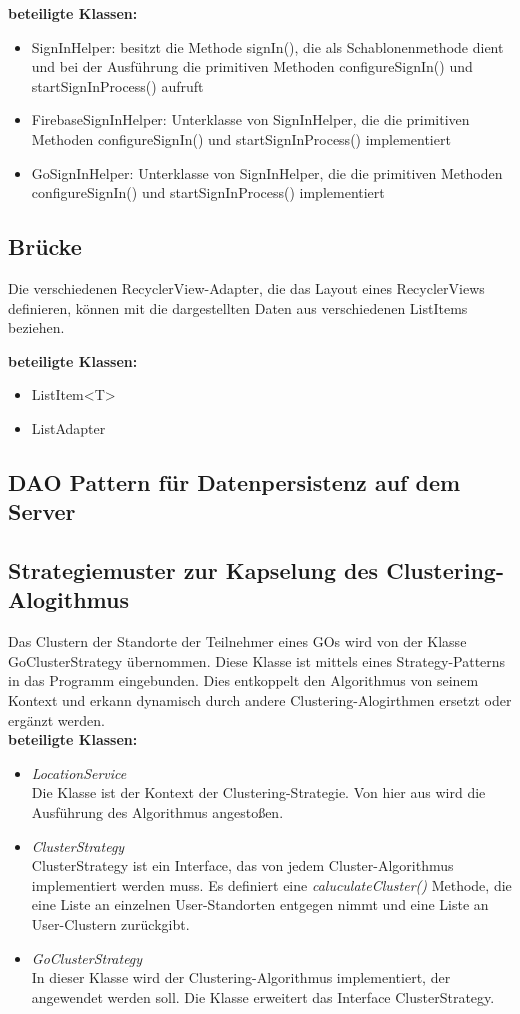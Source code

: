 \textbf{beteiligte Klassen:}
\begin{itemize}
	\item SignInHelper: besitzt die Methode signIn(), die als Schablonenmethode dient und bei der Ausführung die primitiven Methoden configureSignIn() und startSignInProcess() aufruft
	\item FirebaseSignInHelper: Unterklasse von SignInHelper, die die primitiven Methoden configureSignIn() und startSignInProcess() implementiert
	\item GoSignInHelper: Unterklasse von SignInHelper, die die primitiven Methoden configureSignIn() und startSignInProcess() implementiert
\end{itemize}

\subsection{Brücke}
Die verschiedenen RecyclerView-Adapter, die das Layout eines RecyclerViews definieren, können mit die dargestellten Daten aus verschiedenen ListItems beziehen.

\textbf{beteiligte Klassen:}
\begin{itemize}
	\item ListItem<T>
	\item ListAdapter
\end{itemize}

\subsection{DAO Pattern für Datenpersistenz auf dem Server}

\subsection{Strategiemuster zur Kapselung des Clustering-Alogithmus}
Das Clustern der Standorte der Teilnehmer eines GOs wird von der Klasse GoClusterStrategy übernommen. Diese Klasse ist mittels eines Strategy-Patterns in das Programm eingebunden. Dies entkoppelt den Algorithmus von seinem Kontext und erkann dynamisch durch andere Clustering-Alogirthmen ersetzt oder ergänzt werden. \\

\textbf{beteiligte Klassen:}
\begin{itemize}
	\item \textit{LocationService} \\
	Die Klasse ist der Kontext der Clustering-Strategie. Von hier aus wird die Ausführung des Algorithmus angestoßen.
	\item \textit{ClusterStrategy} \\
	ClusterStrategy ist ein Interface, das von jedem Cluster-Algorithmus implementiert werden muss. Es definiert eine \textit{caluculateCluster()} Methode, die eine Liste an einzelnen User-Standorten entgegen nimmt und eine Liste an User-Clustern zurückgibt.
	\item \textit{GoClusterStrategy} \\
	In dieser Klasse wird der Clustering-Algorithmus implementiert, der angewendet werden soll. Die Klasse erweitert das Interface ClusterStrategy.
\end{itemize}

